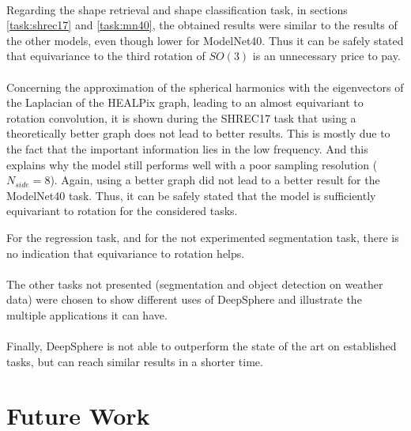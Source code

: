 \documentclass[11pt]{report}
\begin{document}
\paragraph*{}
Regarding the shape retrieval and shape classification task, in sections \ref{task:shrec17} and \ref{task:mn40}, the obtained results were similar to the results of the other models, even though lower for ModelNet40. Thus it can be safely stated that equivariance to the third rotation of $SO(3)$ is an unnecessary price to pay. 

\paragraph*{}
Concerning the approximation of the spherical harmonics with the eigenvectors of the Laplacian of the HEALPix graph, leading to an almost equivariant to rotation convolution, it is shown during the SHREC17 task that using a theoretically better graph  does not lead to better results. This is mostly due to the fact that the important information lies in the low frequency. And this explains why the model still performs well with a poor sampling resolution ($N_{side}=8$).
Again, using a better graph did not lead to a better result for the ModelNet40 task. Thus, it can be safely stated that the model is sufficiently equivariant to rotation for the considered tasks.

For the regression task, and for the not experimented segmentation task, there is no indication that equivariance to rotation helps. %

\paragraph*{}
The other tasks not presented (segmentation and object detection on weather data) were chosen to show different uses of DeepSphere and illustrate the multiple applications it can have.

\paragraph*{}
Finally, DeepSphere is not able to outperform the state of the art on established tasks, but can reach similar results in a shorter time.

\section{Future Work}
\end{document}
